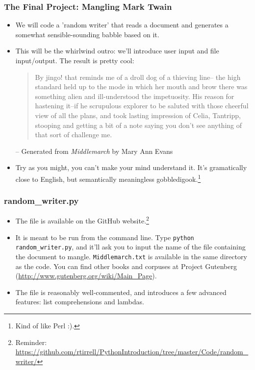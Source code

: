 \documentclass[10pt]{beamer}
\begin{document}
\begin{frame}
  \frametitle{The Final Project: Mangling Mark Twain}
  \begin{itemize}
    \item We will code a 'random writer' that reads a document and generates a somewhat sensible-sounding babble based on it.
    \item This will be the whirlwind outro: we'll introduce user input and file input/output.
      The result is pretty cool: \\
      \begin{quote}
        \small
        By jingo! that reminds me of a droll dog of a thieving line-- the high standard held up to the mode in which her mouth and brow there was something alien and ill-understood the impetuosity.  
        His reason for hastening it--if he scrupulous explorer to be saluted with those cheerful view of all the plans, and took lasting impression of Celia, Tantripp, stooping and getting a bit of a note saying you don't see anything of that sort of challenge me.
      \end{quote}
      \begin{flushright}
        \footnotesize -- Generated from \emph{Middlemarch} by Mary Ann Evans
      \end{flushright}
      \item Try as you might, you can't make your mind understand it.
        It's gramatically close to English, but semantically meaningless gobbledigook.\footnote{Kind of like Perl :).}
  \end{itemize}
\end{frame}

\begin{frame}
  \frametitle{random\_writer.py}
  \begin{itemize}
    \item The file is available on the GitHub website.\footnote{Reminder: \href{https://github.com/rtirrell/PythonIntroduction/tree/master/Code/random\_writer/}{https://github.com/rtirrell/PythonIntroduction/tree/master/Code/random\_writer/}}
    \item It is meant to be run from the command line.
      Type \texttt{python random\_writer.py}, and it'll ask you to input the name of the file containing the document to mangle.
      \texttt{Middlemarch.txt} is available in the same directory as the code.
      You can find other books and corpuses at Project Gutenberg (\href{http://www.gutenberg.org/wiki/Main\_Page}{http://www.gutenberg.org/wiki/Main\_Page}).
    \item The file is reasonably well-commented, and introduces a few advanced features: list comprehensions and lambdas.
  \end{itemize}
\end{frame}
\end{document}
